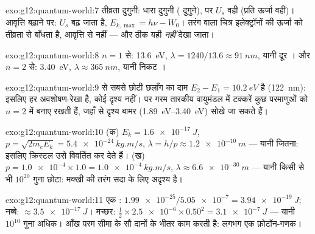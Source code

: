 \begin{solution}{exo:g12:quantum-world:7}
तीव्रता दुगुनी: धारा दुगुनी ( दुगुने), पर $U_s$ वही (प्रति
 ऊर्जा वही)। आवृत्ति बढ़ाने पर: $U_s$ बढ़ जाता
है, $E_{k,\max} = h\nu - W_0$। तरंग वाला चित्र इलेक्ट्रॉनों की ऊर्जा को तीव्रता
से बाँधता है, आवृत्ति से नहीं --- और ठीक यही \emph{नहीं} देखा जाता।
\end{solution}

\begin{solution}{exo:g12:quantum-world:8}
$n = 1$ से: \qty{13.6}{eV}, $\lambda = 1240/13.6 \approx
\qty{91}{nm}$, यानी दूर । और $n = 2$ से: \qty{3.40}{eV},
$\lambda \approx \qty{365}{nm}$, यानी निकट ।
\end{solution}

\begin{solution}{exo:g12:quantum-world:9}
 से सबसे छोटी छलाँग का दाम $E_2 - E_1 =
\qty{10.2}{eV}$ है (\qty{122}{nm}): इसलिए हर
अवशोषण-रेखा  है, कोई दृश्य नहीं। पर गरम तारकीय वायुमंडल में
टक्करें कुछ परमाणुओं को $n = 2$ में बनाए रखती हैं, जहाँ से दृश्य बामर
 (\qtyrange{1.89}{3.40}{eV}) सोखे जा सकते हैं।
\end{solution}

\begin{solution}{exo:g12:quantum-world:10}
(क) $E_k = \qty{1.6e-17}{J}$, $p = \sqrt{2m_e E_k} =
\qty{5.4e-24}{kg.m/s}$, $\lambda = h/p \approx \qty{1.2e-10}{m}$ --- यानी  जितना: इसलिए क्रिस्टल उसे विवर्तित
कर देते हैं। (ख) $p = \num{1.0e-4} \times 1.0 =
\qty{1.0e-4}{kg.m/s}$, $\lambda \approx \qty{6.6e-30}{m}$ --- यानी किसी  से भी $10^{20}$ गुना
छोटा: मक्खी की तरंग सदा के लिए अदृश्य है।
\end{solution}

\begin{solution}{exo:g12:quantum-world:11}
एक : $\num{1.99e-25}/\num{5.05e-7} = \qty{3.94e-19}{J}$; नब्बे: $\approx \qty{3.5e-17}{J}$। मच्छर: $\tfrac12 \times \num{2.5e-6}
\times 0.50^2 = \qty{3.1e-7}{J}$ --- यानी $10^{10}$ गुना
अधिक। आँख परम सीमा के सौ दानों के भीतर काम करती है: लगभग एक फ़ोटॉन-गणक।
\end{solution}

